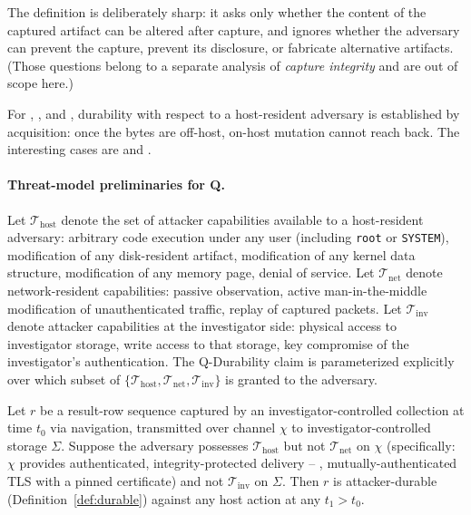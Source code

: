 The definition is deliberately sharp: it asks only whether the content of
the captured artifact can be altered after capture, and ignores whether the
adversary can prevent the capture, prevent its disclosure, or fabricate
alternative artifacts. (Those questions belong to a separate analysis of
\emph{capture integrity} and are out of scope here.)

For , , and , durability with respect to a host-resident
adversary is established by acquisition: once the bytes are off-host, on-host
mutation cannot reach back. The interesting cases are  and .

\paragraph{Threat-model preliminaries for Q.} Let $\mathcal{T}_{\mathrm{host}}$
denote the set of attacker capabilities available to a host-resident
adversary: arbitrary code execution under any user (including \texttt{root}
or \texttt{SYSTEM}), modification of any disk-resident artifact,
modification of any kernel data structure, modification of any memory
page, denial of service. Let $\mathcal{T}_{\mathrm{net}}$ denote
network-resident capabilities: passive observation, active
man-in-the-middle modification of unauthenticated traffic, replay of
captured packets. Let $\mathcal{T}_{\mathrm{inv}}$ denote attacker
capabilities at the investigator side: physical access to investigator
storage, write access to that storage, key compromise of the investigator's
authentication. The Q-Durability claim is parameterized explicitly over
which subset of $\{\mathcal{T}_{\mathrm{host}}, \mathcal{T}_{\mathrm{net}},
\mathcal{T}_{\mathrm{inv}}\}$ is granted to the adversary.

\begin{proposition}
\label{prop:q-durability}
Let $r$ be a result-row sequence captured by an investigator-controlled
collection at time $t_0$ via  navigation, transmitted over channel
$\chi$ to investigator-controlled storage $\Sigma$. Suppose the adversary
possesses $\mathcal{T}_{\mathrm{host}}$ but not $\mathcal{T}_{\mathrm{net}}$
on $\chi$ (specifically: $\chi$ provides authenticated, integrity-protected
delivery -- \eg{}, mutually-authenticated TLS with a pinned certificate)
and not $\mathcal{T}_{\mathrm{inv}}$ on $\Sigma$. Then $r$ is
attacker-durable (Definition~\ref{def:durable}) against any host action at
any $t_1 > t_0$.
\end{proposition}

